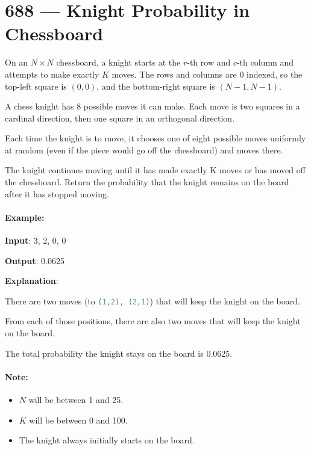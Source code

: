 \section{688 --- Knight Probability in Chessboard}
On an $N\times N$ chessboard, a knight starts at the $r$-th row and $c$-th column and attempts to make exactly $K$ moves. The rows and columns are 0 indexed, so the top-left square is $(0, 0)$, and the bottom-right square is $(N-1, N-1)$.

A chess knight has 8 possible moves it can make. Each move is two squares in a cardinal direction, then one square in an orthogonal direction.
 
Each time the knight is to move, it chooses one of eight possible moves uniformly at random (even if the piece would go off the chessboard) and moves there.

The knight continues moving until it has made exactly K moves or has moved off the chessboard. Return the probability that the knight remains on the board after it has stopped moving.
 

\paragraph{Example:}

\begin{flushleft}
\textbf{Input}: 3, 2, 0, 0

\textbf{Output}: 0.0625

\textbf{Explanation}: 

There are two moves (to \lstinline[language=C++, basicstyle=\small\ttfamily, keywordstyle=\bfseries\color{green!40!black}]|(1,2), (2,1)|) that will keep the knight on the board.

From each of those positions, there are also two moves that will keep the knight on the board.

The total probability the knight stays on the board is 0.0625.
\end{flushleft}


  

\paragraph{Note:}

\begin{itemize}
\item $N$ will be between 1 and 25.

\item $K$ will be between 0 and 100.

\item The knight always initially starts on the board.
\end{itemize}

